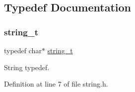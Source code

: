 \subsection{Typedef Documentation}
\mbox{\label{a00023_ab0dcbec9b4b3c60b939b1095f93cb1b9_ab0dcbec9b4b3c60b939b1095f93cb1b9}} 
\subsubsection{\texorpdfstring{string\+\_\+t}{string\_t}}
{\footnotesize\ttfamily typedef char$\ast$ \hyperlink{a00023_ab0dcbec9b4b3c60b939b1095f93cb1b9_ab0dcbec9b4b3c60b939b1095f93cb1b9}{string\+\_\+t}}



String typedef. 



Definition at line 7 of file string.\+h.

